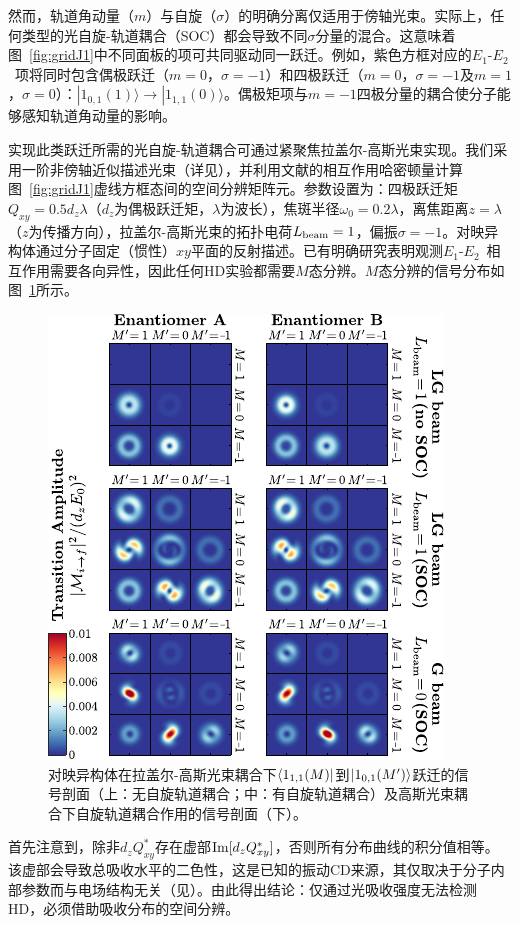 \documentclass[reprint,aps,prl,twocolumn,superscriptaddress,groupedaddress]{revtex4-2}
\newcommand{\eoet}{$E_1$-$E_2$}
\begin{document}
然而，轨道角动量（$m$）与自旋（$\sigma$）的明确分离仅适用于傍轴光束。实际上，任何类型的光自旋-轨道耦合（SOC）都会导致不同$\sigma$分量的混合\cite{Bliokh2015,Bliokh2023}。这意味着图~\ref{fig:gridJ1}中不同面板的项可共同驱动同一跃迁。例如，紫色方框对应的\eoet~项将同时包含偶极跃迁（$m=0$，$\sigma=-1$）和四极跃迁（$m=0$，$\sigma=-1$及$m=1$，$\sigma=0$）：$| 1_{0,1}(1) \rangle \to | 1_{1,1}(0) \rangle$。偶极矩项与$m=-1$四极分量的耦合使分子能够感知轨道角动量的影响。

实现此类跃迁所需的光自旋-轨道耦合可通过紧聚焦拉盖尔-高斯光束实现\cite{Loeffler2011,Forbes2021nonparaxial,Forbes2021longitudinal}。我们采用一阶非傍轴近似描述光束\cite{Lax1975}（详见\cite{Note1}），并利用文献\cite{Maslov2024,Maslov_Thesis}的相互作用哈密顿量计算图~\ref{fig:gridJ1}虚线方框态间的空间分辨矩阵元。参数设置为：四极跃迁矩$Q_{xy}=0.5d_z\lambda$（$d_z$为偶极跃迁矩，$\lambda$为波长），焦斑半径$\omega_0=0.2\lambda$，离焦距离$z=\lambda$（$z$为传播方向），拉盖尔-高斯光束的拓扑电荷$L_{\rm beam}=1$，偏振$\sigma=-1$。对映异构体通过分子固定（惯性）$xy$平面的反射描述。已有明确研究\cite{Buckingham1971, Power1975}表明观测\eoet~相互作用需要各向异性，因此任何HD实验都需要$M$态分辨。$M$态分辨的信号分布如图~\ref{fig:profiles}所示。

\begin{figure}[t!]
    \centering
    \includegraphics[width=1.0\columnwidth]{Figure2.pdf}
    \caption{对映异构体在拉盖尔-高斯光束耦合下$\bra{1_{1,1}(M)}$到$\ket{1_{0,1}(M')}$跃迁的信号剖面（上：无自旋轨道耦合；中：有自旋轨道耦合）及高斯光束耦合下自旋轨道耦合作用的信号剖面（下）。}
    \label{fig:profiles}
\end{figure}
首先注意到，除非$d_zQ_{xy}^*$存在虚部${\rm Im}[d_zQ_{xy}^*]$，否则所有分布曲线的积分值相等。该虚部会导致总吸收水平的二色性，这是已知的振动CD来源，其仅取决于分子内部参数而与电场结构无关（见\cite{Buckingham1971}）。由此得出结论：仅通过光吸收强度无法检测HD，必须借助吸收分布的空间分辨\cite{Loeffler2011}。
\end{document}
